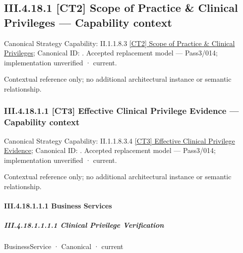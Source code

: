 \subsection*{III.4.18.1 [CT2] Scope of Practice \& Clinical Privileges — Capability context}
\label{navigation:III.4.18.1}

{\small Canonical Strategy Capability: II.1.1.8.3 \hyperref[element:eef619227c014eb2803da8a9e47635fe]{[CT2] Scope of Practice \& Clinical Privileges}; Canonical ID: \texttt{}. Accepted replacement model — Pass3/014; implementation unverified · current.}\par
Contextual reference only; no additional architectural instance or semantic relationship.\par
\subsubsection*{III.4.18.1.1 [CT3] Effective Clinical Privilege Evidence — Capability context}
\label{navigation:III.4.18.1.1}

{\small Canonical Strategy Capability: II.1.1.8.3.4 \hyperref[element:addeadbd69fe470198b32c563f476f75]{[CT3] Effective Clinical Privilege Evidence}; Canonical ID: \texttt{}. Accepted replacement model — Pass3/014; implementation unverified · current.}\par
Contextual reference only; no additional architectural instance or semantic relationship.\par
\paragraph*{III.4.18.1.1.1 Business Services}
\label{navigation:III.4.18.1.1.1}

\subparagraph*{III.4.18.1.1.1.1 Clinical Privilege Verification}
\label{navigation:III.4.18.1.1.1.1}

\label{element:f6599b4283194577a977bfc86ea854c2}
{\small BusinessService · Canonical · current}\par


